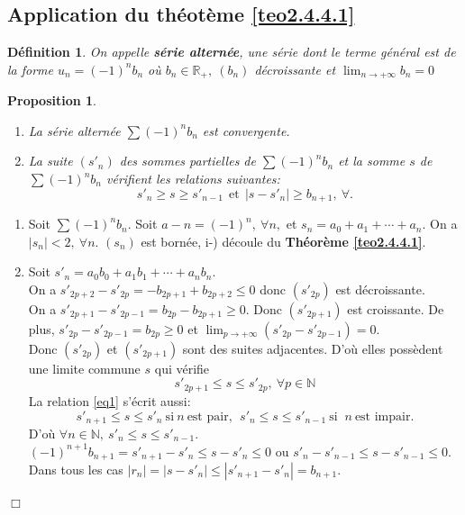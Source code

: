 \documentclass[11pt, a4paper]{book}
\newtheorem{defi}{D\'efinition}[section]
\newtheorem{pro}{Proposition}[section]
\newenvironment{pr}{\noindent {\bf Preuve} \noindent} {\hfill $\Box$\vskip 5mm}
\begin{document}
\subsection{Application du th\'eot\`eme \ref{teo2.4.4.1} }
\begin{defi} On appelle \textbf{s\'erie altern\'ee}, une s\'erie dont le terme g\'en\'eral est de la forme $u_n=(-1)^n b_n$ o\`u $b_n \in \mathbb{R}_+,~(b_n)$ d\'ecroissante et ${\displaystyle \lim_{n\rightarrow+\infty}b_n=0}$\end{defi}
\begin{pro} \begin{enumerate}
\item[i-] La s\'erie altern\'ee $\sum (-1)^n b_n$ est convergente.
\item[ii-] La suite $(s'_n)$ des sommes partielles de $\sum (-1)^n b_n$ et la somme $s$ de $\sum (-1)^n b_n$ v\'erifient les relations suivantes: $$ s'_n\geq s\geq s'_{n-1} ~~\text{et}~~ |s-s'_n|\geq b_{n+1},~\forall.$$
\end{enumerate} \end{pro}
\begin{pr}
\begin{enumerate}
\item[i-] Soit $\sum (-1)^n b_n$. Soit $a-n=(-1)^n,~\forall n,$ et $ s_n=a_0+a_1+\cdots+a_n.$ On a $|s_n|<2,~\forall n.$ $(s_n)$ est born\'ee, i-) d\'ecoule du \textbf{Th\'eor\`eme \ref{teo2.4.4.1}}. 
\item[ii-] Soit $s'_n=a_0 b_0 +a_1 b_1 +\cdots+a_n b_n.$ \\
On a $s'_{2p+2}-s'_{2p}=-b_{2p+1}+b_{2p+2}\leq 0$ donc $(s'_{2p})$ est d\'ecroissante.\\ 
On a $s'_{2p+1}-s'_{2p-1}=b_{2p}-b_{2p+1}\geq0.$ Donc $(s'_{2p+1}) $ est croissante. De plus, $s'_{2p}-s'_{2p-1}=b_{2p}\geq0$ et ${\displaystyle \lim_{p\rightarrow+\infty}(s'_{2p}-s'_{2p-1})=0}$. \\
Donc $(s'_{2p})$ et $(s'_{2p+1})$ sont des suites adjacentes. D'o\`u elles poss\`edent une limite commune $s$ qui v\'erifie \begin{equation}
s'_{2p+1}\leq s\leq s'_{2p},~\forall p \in \mathbb{N} \label{eq1}
\end{equation}
La relation \ref{eq1} s'\'ecrit aussi: $$ s'_{n+1}\leq s\leq s'_n ~\text{si}~ n ~\text{est pair}, ~~ s'_n\leq s\leq s'_{n-1} ~\text{si }~ n ~ \text{est impair}.$$ D'o\`u $\forall n\in \mathbb{N},~ s'_n\leq s\leq s'_{n-1}.$ \\ 
$(-1)^{n+1}b_{n+1}=s'_{n+1}-s'_n\leq s-s'_n\leq0$ ou $s'_n-s'_{n-1}\leq s-s'_{n-1}\leq0.$ \\ Dans tous les cas $|r_n|=|s-s'_n|\leq |s'_{n+1}-s'_n|=b_{n+1}.$
\end{enumerate}
\end{pr}
\end{document}
